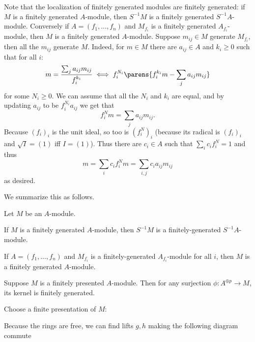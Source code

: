 Note that the localization of finitely generated modules are finitely generated: if $M$ is a finitely generated $A$-module, then $S^{-1}M$ is a finitely generated $S^{-1}A$-module.
Conversely if $A=(f_1,\dots,f_n)$ and $M_{f_i}$ is a finitely generated $A_{f_i}$-module, then $M$ is a finitely generated $A$-module.
Suppose $m_{ij}\in M$ generate $M_{f_i}$, then all the $m_{ij}$ generate $M$.
Indeed, for $m\in M$ there are $a_{ij}\in A$ and $k_i\geq0$ such that for all $i$:
$$ m = \frac{\sum_j a_{ij}m_{ij}}{f_i^{k_i}} \iff f_i^{N_i}\parens{f_i^{k_i}m - \sum_j a_{ij}m_{ij}} $$
for some $N_i\geq0$.
We can assume that all the $N_i$ and $k_i$ are equal, and by updating $a_{ij}$ to be $f_i^{N_i}a_{ij}$ we get that
$$ f_i^Nm = \sum_ja_{ij}m_{ij} . $$
Because $(f_i)_i$ is the unit ideal, so too is $(f_i^N)_i$ (because its radical is $(f_i)_i$ and $\sqrt I=(1)$ iff $I=(1)$).
Thus there are $c_i\in A$ such that $\sum_ic_if_i^N=1$ and thus
$$ m = \sum_ic_if_i^Nm = \sum_{i,j}c_ia_{ij}m_{ij} $$
as desired.

We summarize this as follows.

\bprop

    Let $M$ be an $A$-module.
    \benum
        \item If $M$ is a finitely generated $A$-module, then $S^{-1}M$ is a finitely-generated $S^{-1}A$-module.
        \item If $A=(f_1,\dots,f_n)$ and $M_{f_i}$ is a finitely-generated $A_{f_i}$-module for all $i$, then $M$ is a finitely generated $A$-module.
    \eenum

\eprop

\blemm

    Suppose $M$ is a finitely presented $A$-module.
    Then for any surjection $\phi\colon A^{\oplus p}\to M$, its kernel is finitely generated.

\elemm

\bproof

    Choose a finite presentation of $M$:


    Because the rings are free, we can find lifts $g,h$ making the following diagram commute

